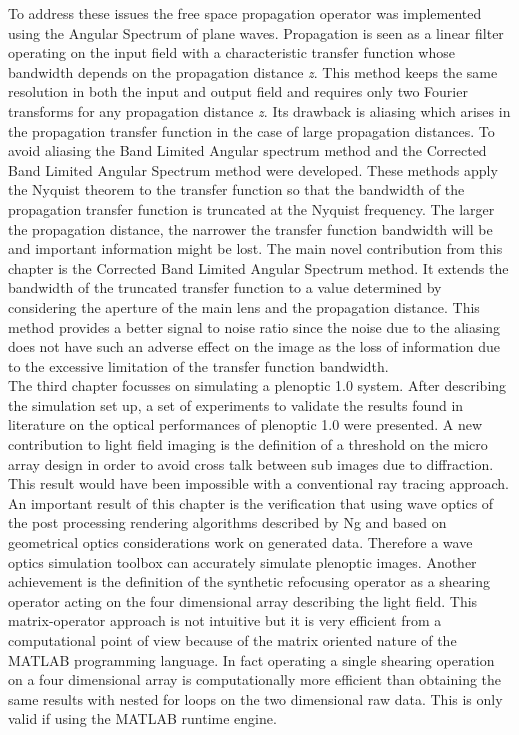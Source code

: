 To address these issues the free space propagation operator was implemented using the Angular Spectrum of plane waves. Propagation is seen as a linear filter operating on the input field with a characteristic transfer function whose bandwidth depends on the propagation distance \textit{z}. This method keeps the same resolution in both the input and output field and requires only two Fourier transforms for any propagation distance \textit{z}. Its drawback is aliasing which arises in the propagation transfer function in the case of large propagation distances. To avoid aliasing the Band Limited Angular spectrum method and the Corrected Band Limited Angular Spectrum method were developed. These methods apply the Nyquist theorem to the transfer function so that the bandwidth of the propagation transfer function is truncated at the Nyquist frequency. The larger the propagation distance, the narrower the transfer function bandwidth will be and important information might be lost. The main novel contribution from this chapter is the Corrected Band Limited Angular Spectrum method. It extends the bandwidth of the truncated transfer function to a value determined by considering the aperture of the main lens and the propagation distance. This method provides a better signal to noise ratio since the noise due to the aliasing does not have such an adverse effect on the image as the loss of information due to the excessive limitation of the transfer function bandwidth.
\\ 
The third chapter focusses on simulating a plenoptic 1.0 system. After describing the simulation set up, a set of experiments to validate the results found in literature on the optical performances of plenoptic 1.0 were presented. A new contribution to light field imaging is the definition of a threshold on the micro array design in order to avoid cross talk between sub images due to diffraction. This result would have been impossible with a conventional ray tracing approach. An important result of this chapter is the verification that using wave optics of the post processing rendering algorithms described by Ng \cite{ng2006digital} and based on geometrical optics considerations work on generated data. Therefore a wave optics simulation toolbox can accurately simulate plenoptic images. Another achievement is the definition of the synthetic refocusing operator as a shearing operator acting on the four dimensional array describing the light field. This matrix-operator approach is not intuitive but it is very efficient from a computational point of view because of the matrix oriented nature of the MATLAB programming language. In fact operating a single shearing operation on a four dimensional array is computationally more efficient than obtaining the same results with nested for loops on the two dimensional raw data. This is only valid if using the MATLAB runtime engine.\\
